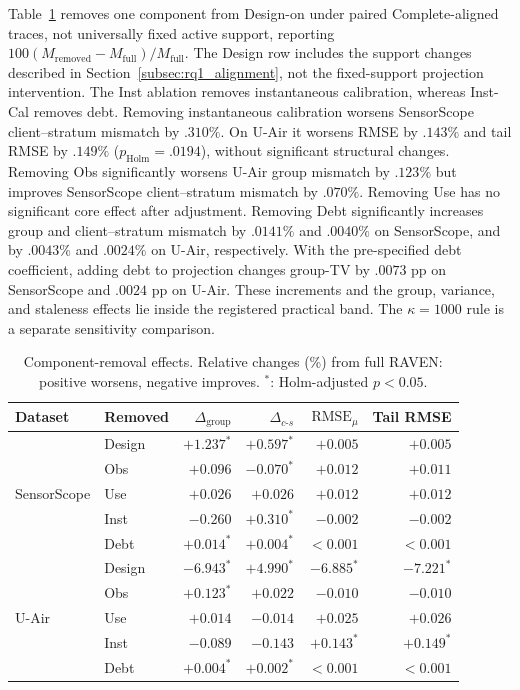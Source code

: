 \documentclass[letterpaper,journal]{IEEEtran}
\begin{document}
Table~\ref{tab:e4_ablation} removes one component from Design-on under paired
Complete-aligned traces, not universally fixed active support, reporting
$100(M_{\mathrm{removed}}-M_{\mathrm{full}})/M_{\mathrm{full}}$.
The Design row includes the support changes described in
Section~\ref{subsec:rq1_alignment}, not the fixed-support projection intervention.
The Inst ablation removes instantaneous calibration, whereas Inst-Cal removes
debt. Removing instantaneous calibration worsens SensorScope client--stratum mismatch by $.310\%$.
On U-Air it worsens RMSE by $.143\%$ and tail RMSE by $.149\%$
($p_{\mathrm{Holm}}=.0194$), without significant structural changes.
Removing Obs significantly worsens U-Air group mismatch by $.123\%$ but
improves SensorScope client--stratum mismatch by $.070\%$. Removing Use has
no significant core effect after adjustment. Removing Debt significantly
increases group and client--stratum mismatch by $.0141\%$ and $.0040\%$ on
SensorScope, and by $.0043\%$ and $.0024\%$ on U-Air, respectively.
With the pre-specified debt coefficient, adding debt to projection changes
group-TV by $.0073$ pp on SensorScope and $.0024$ pp on U-Air. These
increments and the group, variance, and staleness effects lie inside the
registered practical band. The $\kappa=1000$ rule is a separate sensitivity
comparison.

\begin{table}[!htbp]
\centering
\caption{Component-removal effects.
Relative changes (\%) from full RAVEN: positive worsens, negative improves.
$^\ast$: Holm-adjusted $p<0.05$.}
\label{tab:e4_ablation}
\setlength{\tabcolsep}{3.5pt}
\begin{tabular}{llrrrr}
\toprule
Dataset & Removed & $\Delta_{\mathrm{group}}$ &
$\Delta_{c\text{-}s}$ & $\mathrm{RMSE}_{\mu}$ & Tail RMSE\\
\midrule
\multirow{5}{*}{SensorScope}
& Design & $+1.237^\ast$ & $+0.597^\ast$ & $+0.005$ & $+0.005$\\
& Obs    & $+0.096$       & $-0.070^\ast$ & $+0.012$ & $+0.011$\\
& Use    & $+0.026$       & $+0.026$       & $+0.012$ & $+0.012$\\
& Inst   & $-0.260$       & $+0.310^\ast$ & $-0.002$ & $-0.002$\\
& Debt   & $+0.014^\ast$ & $+0.004^\ast$ & $<0.001$ & $<0.001$\\
\midrule
\multirow{5}{*}{U-Air}
& Design & $-6.943^\ast$ & $+4.990^\ast$ & $-6.885^\ast$ & $-7.221^\ast$\\
& Obs    & $+0.123^\ast$ & $+0.022$       & $-0.010$       & $-0.010$\\
& Use    & $+0.014$       & $-0.014$       & $+0.025$       & $+0.026$\\
& Inst   & $-0.089$       & $-0.143$       & $+0.143^\ast$ & $+0.149^\ast$\\
& Debt   & $+0.004^\ast$ & $+0.002^\ast$ & $<0.001$ & $<0.001$\\
\bottomrule
\end{tabular}
\end{table}
\end{document}
